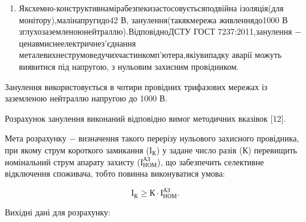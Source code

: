\begin{enumerate}
	\item Як\hfill схемно-конструктивна\hfill міра\hfill безпеки\hfill застосовується\hfill подвійна\newline \hspace*{-18mm} ізоляція\hfill (для монітору),\hfill малі\hfill напруги\hfill до\hfill 42 В, занулення\hfill (так\hfill як\hfill мережа\newline \hspace*{-18mm} живлення\hfill до\hfill 1000 В з\hfill глухо\hfill заземленою\hfill нейтраллю).\hfill Відповідно\hfill ДСТУ\newline \hspace*{-18mm} ГОСТ 7237:2011,\hfill занулення $-$ це\hfill навмисне\hfill електричне\hfill з’єднання\newline \hspace*{-18mm} металевих\hfill неструмоведучих\hfill частин\hfill комп’ютера,\hfill які\hfill у\hfill випадку\newline \hspace*{-18mm} аварії можуть виявитися під напругою, з нульовим захисним провідником.
\end{enumerate}

Занулення використовується в чотири провідних трифазових мережах із заземленою нейтраллю напругою до 1000 В.

Розрахунок занулення виконаний відповідно вимог методичних вказівок [12].

Мета розрахунку $-$ визначення такого перерізу нульового захисного провідника, при якому струм короткого замикання ($\text{І}_{\text{К}}$) у задане число разів ($\text{К}$) перевищить номінальний струм апарату захисту ($\text{І}^{\text{АЗ}}_{\text{НОМ}}$), що забезпечить селективне відключення споживача, тобто повинна виконуватися умова:

\begin{equation}\label{eq:work1}
	\text{І}_{\text{К}} \ge \text{К} \cdot \text{І}^{\text{АЗ}}_{\text{НОМ}}.
\end{equation}

\vspace{1.5em}

Вихідні дані для розрахунку:


